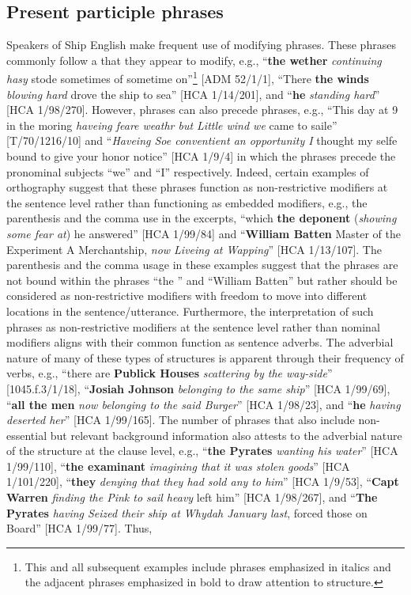 \subsection{{Present participle phrases} }\label{sec:5.5.2}

Speakers of Ship English make frequent use of modifying  phrases. These  phrases commonly follow a  that they appear to modify, e.g., “\textbf{the wether} \textit{continuing hasy} stode sometimes of sometime on”\footnote{This and all subsequent examples include  phrases emphasized in italics and the adjacent  phrases emphasized in bold to draw attention to structure.} [ADM 52/1/1], “There \textbf{the winds} \textit{blowing hard} drove the ship to sea” [HCA 1/14/201], and “\textbf{he} \textit{standing hard}” [HCA 1/98/270]. However,  phrases can also precede  phrases, e.g., “This day at 9 in the moring \textit{haveing feare weathr but Little wind we} came to saile” [T/70/1216/10] and “\textit{Haveing Soe conventient an opportunity I} thought my selfe bound to give your honor notice” [HCA 1/9/4] in which the  phrases precede the pronominal subjects “we” and “I” respectively. Indeed, certain examples of orthography suggest that these phrases function as non-restrictive modifiers at the sentence level rather than functioning as embedded   modifiers, e.g., the parenthesis and the comma use in the excerpts, “which \textbf{the deponent} (\textit{showing some fear at}) he answered” [HCA 1/99/84] and “\textbf{William Batten} Master of the Experiment A Merchantship, \textit{now Liveing at Wapping}” [HCA 1/13/107]. The parenthesis and the comma usage in these examples suggest that the phrases are not bound within the  phrases “the ” and “William Batten” but rather should be considered as non-restrictive modifiers with freedom to move into different locations in the sentence/utterance. Furthermore, the interpretation of such phrases as non-restrictive modifiers at the sentence level rather than nominal modifiers aligns with their common function as sentence adverbs. The adverbial nature of many of these types of structures is apparent through their frequency of  verbs, e.g., “there are \textbf{Publick Houses} \textit{scattering by the way-side}” [1045.f.3/1/18], “\textbf{Josiah Johnson} \textit{belonging to the same ship}” [HCA 1/99/69], “\textbf{all the men} \textit{now belonging to the said Burger}” [HCA 1/98/23], and “\textbf{he} \textit{having deserted her}” [HCA 1/99/165]. The number of phrases that also include non-essential but relevant background information also attests to the adverbial nature of the structure at the clause level, e.g., “\textbf{the Pyrates} \textit{wanting his water}” [HCA 1/99/110], “\textbf{the examinant} \textit{imagining that it was stolen goods}” [HCA 1/101/220], “\textbf{they} \textit{denying that they had sold any to him}” [HCA 1/9/53], “\textbf{Capt Warren} \textit{finding the Pink to sail heavy} left him” [HCA 1/98/267], and “\textbf{The Pyrates} \textit{having Seized their ship at Whydah January last}, forced those on Board” [HCA 1/99/77]. Thus, 